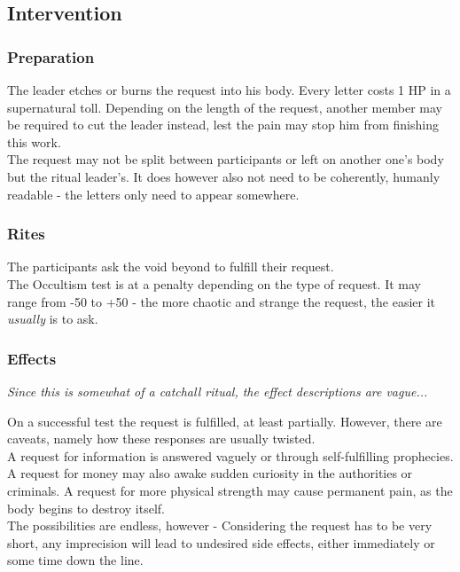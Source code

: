\subsection*{Intervention}
\subsubsection*{Preparation}
The leader etches or burns the request into his body.
Every letter costs 1 HP in a supernatural toll.
Depending on the length of the request,
another member may be required to cut the leader instead,
lest the pain may stop him from finishing this work.
\\%
The request may not be split between participants
	or left on another one's body but the ritual leader's.
It does however also not need to be coherently, humanly readable
	- the letters only need to appear somewhere.
\subsubsection*{Rites}
The participants ask the void beyond to fulfill their request.
\\%
The Occultism test is at a penalty depending on the type of request.
It may range from -50 to +50
	- the more chaotic and strange the request,
	the easier it \emph{usually} is to ask.
\\%
\subsubsection*{Effects}
\emph{Since this is somewhat of a catchall ritual, the effect descriptions are vague...}
\par \vspace{-8mm}
On a successful test the request is fulfilled, at least partially.
However, there are caveats, namely how these responses are usually twisted.
\\%
A request for information is answered vaguely or through self-fulfilling prophecies.
A request for money may also awake sudden curiosity in the authorities or criminals.
A request for more physical strength may cause permanent pain,
 as the body begins to destroy itself.
\\%
The possibilities are endless, however -
Considering the request has to be very short,
any imprecision will lead to undesired side effects,
either immediately or some time down the line.
